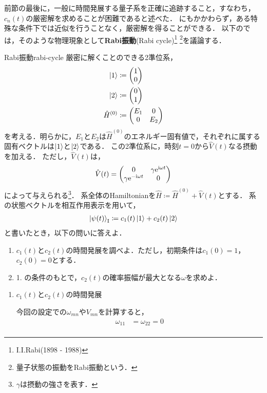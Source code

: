 \documentclass{report}
\begin{document}
  前節の最後に，一般に時間発展する量子系を正確に追跡すること，すなわち，$c_n(t)$の厳密解を求めることが困難であると述べた．
  にもかかわらず，ある特殊な条件下では近似を行うことなく，厳密解を得ることができる．
  以下のでは，そのような物理現象として\textbf{Rabi振動}(Rabi cycle)\footnote{I.I.Rabi(1898 - 1988)}
  \footnote{量子状態の振動をRabi振動という．}を議論する．
  \begin{myex}{Rabi振動}{rabi-cycle}
    厳密に解くことのできる2準位系，
    \begin{align}
      \ket{1} &\coloneqq \mqty(1\\ 0) \\
      \ket{2} &\coloneqq \mqty(0\\ 1) \\
      \hat{H}^{(0)} &\coloneqq \mqty(E_1 & 0\\ 0 & E_2)
    \end{align}
    を考える．明らかに，$E_1$と$E_2$は$\hat{H}^{(0)}$のエネルギー固有値で，それぞれに属する固有ベクトルは$\ket{1}$と$\ket{2}$である．
    この2準位系に，時刻$t = 0$から$\hat{V}(t)$なる摂動を加える．
    ただし，$\hat{V}(t)$は，
    \begin{align}
      \hat{V}(t) = \mqty(
        0 & \gamma\e^{\i\omega t} \\
        \gamma\e^{-\i\omega t} & 0
      )
    \end{align}
    によって与えられる\footnote{$\gamma$は摂動の強さを表す．}．
    系全体のHamiltonianを$\hat{H} \coloneqq \hat{H}^{(0)} + \hat{V}(t)$とする．
    系の状態ベクトルを相互作用表示を用いて，
    \begin{align}
      \ket{\psi(t)}_{\mathrm{I}} \coloneqq c_1(t)\ket{1} + c_2(t)\ket{2}
    \end{align}
    と書いたとき，以下の問いに答えよ．
    \begin{enumerate}
      \item $c_1(t)$と$c_2(t)$の時間発展を調べよ．ただし，初期条件は$c_1(0) = 1$，$c_2(0) = 0$とする．
      \item 1. の条件のもとで，$c_2(t)$の確率振幅が最大となる$\omega$を求めよ．
    \end{enumerate}
    \tcblower
    \begin{enumerate}
      \item $c_1(t)$と$c_2(t)$の時間発展\par
        今回の設定での$\omega_{mn}$や$V_{mn}$を計算すると，
        \begin{align}
          \omega_{11} &= \omega_{22} = 0 \\ 

\end{align}
\end{enumerate}
\end{myex}
\end{document}
